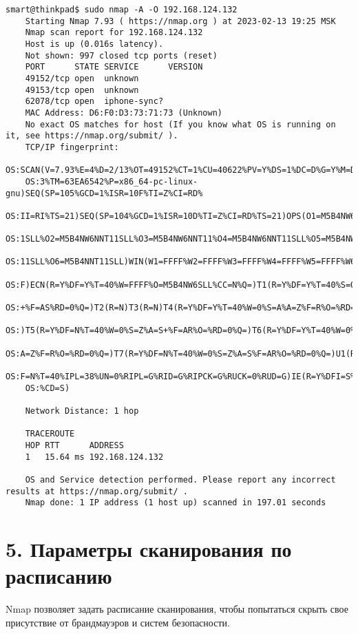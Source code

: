 \begin{Verbatim}[frame=single]
    smart@thinkpad$ sudo nmap -A -O 192.168.124.132
    Starting Nmap 7.93 ( https://nmap.org ) at 2023-02-13 19:25 MSK
    Nmap scan report for 192.168.124.132
    Host is up (0.016s latency).
    Not shown: 997 closed tcp ports (reset)
    PORT      STATE SERVICE      VERSION
    49152/tcp open  unknown
    49153/tcp open  unknown
    62078/tcp open  iphone-sync?
    MAC Address: D6:F0:D3:73:71:73 (Unknown)
    No exact OS matches for host (If you know what OS is running on it, see https://nmap.org/submit/ ).
    TCP/IP fingerprint:
    OS:SCAN(V=7.93%E=4%D=2/13%OT=49152%CT=1%CU=40622%PV=Y%DS=1%DC=D%G=Y%M=D6F0D
    OS:3%TM=63EA6542%P=x86_64-pc-linux-gnu)SEQ(SP=105%GCD=1%ISR=10F%TI=Z%CI=RD%
    OS:II=RI%TS=21)SEQ(SP=104%GCD=1%ISR=10D%TI=Z%CI=RD%TS=21)OPS(O1=M5B4NW6NNT1
    OS:1SLL%O2=M5B4NW6NNT11SLL%O3=M5B4NW6NNT11%O4=M5B4NW6NNT11SLL%O5=M5B4NW6NNT
    OS:11SLL%O6=M5B4NNT11SLL)WIN(W1=FFFF%W2=FFFF%W3=FFFF%W4=FFFF%W5=FFFF%W6=FFF
    OS:F)ECN(R=Y%DF=Y%T=40%W=FFFF%O=M5B4NW6SLL%CC=N%Q=)T1(R=Y%DF=Y%T=40%S=O%A=S
    OS:+%F=AS%RD=0%Q=)T2(R=N)T3(R=N)T4(R=Y%DF=Y%T=40%W=0%S=A%A=Z%F=R%O=%RD=0%Q=
    OS:)T5(R=Y%DF=N%T=40%W=0%S=Z%A=S+%F=AR%O=%RD=0%Q=)T6(R=Y%DF=Y%T=40%W=0%S=A%
    OS:A=Z%F=R%O=%RD=0%Q=)T7(R=Y%DF=N%T=40%W=0%S=Z%A=S%F=AR%O=%RD=0%Q=)U1(R=Y%D
    OS:F=N%T=40%IPL=38%UN=0%RIPL=G%RID=G%RIPCK=G%RUCK=0%RUD=G)IE(R=Y%DFI=S%T=40
    OS:%CD=S)

    Network Distance: 1 hop

    TRACEROUTE
    HOP RTT      ADDRESS
    1   15.64 ms 192.168.124.132

    OS and Service detection performed. Please report any incorrect results at https://nmap.org/submit/ .
    Nmap done: 1 IP address (1 host up) scanned in 197.01 seconds
\end{Verbatim}

\section*{5. Параметры сканирования по расписанию}

Nmap позволяет задать расписание сканирования, чтобы попытаться скрыть свое присутствие от брандмауэров и систем безопасности.

